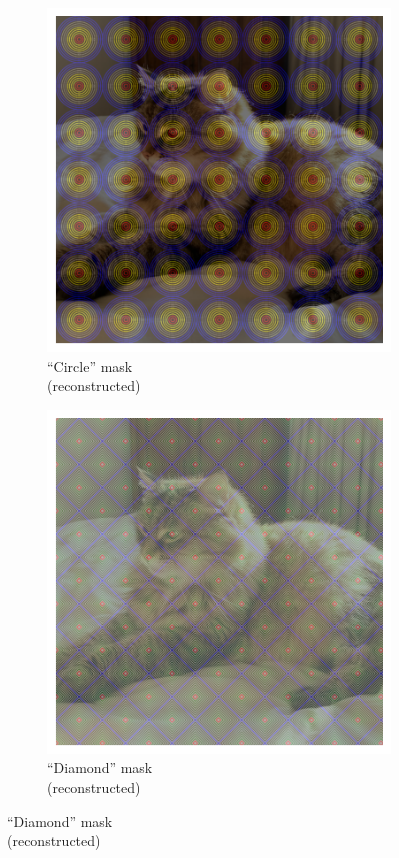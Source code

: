 \documentclass[a4paper, oneside]{discothesis}
\begin{document}
\begin{figure}[th]
	\begin{subfigure}[t]{0.19\textwidth}\centering\includegraphics[width=\linewidth]{figures/hcaptcha-copy-circle.png}\caption{``Circle'' mask\\(reconstructed)}\label{fig:subfig5}\end{subfigure}
	\hfill
	\begin{subfigure}[t]{0.19\textwidth}\centering\includegraphics[width=\linewidth]{figures/hcaptcha-copy-diamond.png}\caption{``Diamond'' mask\\(reconstructed)}\label{fig:subfig6}\end{subfigure}

\end{figure}
\end{document}
